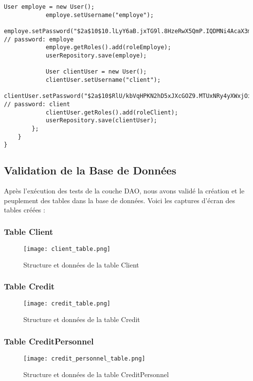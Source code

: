 \begin{lstlisting}[caption=Application de test de la couche DAO]
            User employe = new User();
            employe.setUsername("employe");
            employe.setPassword("$2a$10$10.lLyY6aB.jxTG9l.8HzeRwX5QmP.IQDMNi4AcaX3mQFxVJYIUYy"); // password: employe
            employe.getRoles().add(roleEmploye);
            userRepository.save(employe);

            User clientUser = new User();
            clientUser.setUsername("client");
            clientUser.setPassword("$2a$10$RlU/kbVqHPKN2hD5xJXcGOZ9.MTUxNRy4yXWxjOiQW3/AEf1YybQW"); // password: client
            clientUser.getRoles().add(roleClient);
            userRepository.save(clientUser);
        };
    }
}
\end{lstlisting}

\subsection{Validation de la Base de Données}
Après l'exécution des tests de la couche DAO, nous avons validé la création et le peuplement des tables dans la base de données. Voici les captures d'écran des tables créées :

\subsubsection{Table Client}
\begin{figure}[H]
    \centering
    \texttt{[image: client\_table.png]}
    \caption{Structure et données de la table Client}
\end{figure}

\subsubsection{Table Credit}
\begin{figure}[H]
    \centering
    \texttt{[image: credit\_table.png]}
    \caption{Structure et données de la table Credit}
\end{figure}

\subsubsection{Table CreditPersonnel}
\begin{figure}[H]
    \centering
    \texttt{[image: credit\_personnel\_table.png]}
    \caption{Structure et données de la table CreditPersonnel}
\end{figure}

